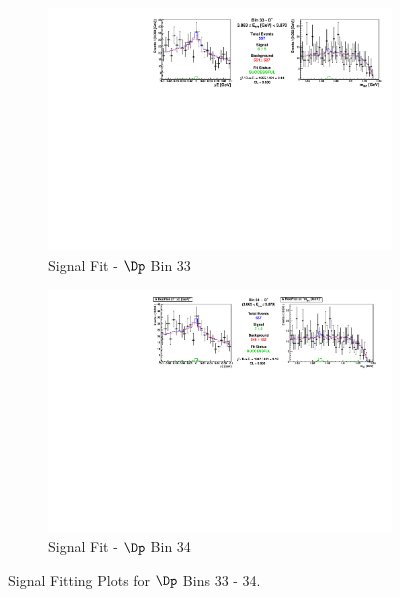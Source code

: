 \begin{figure}[h]

\begin{subfigure}[c]{0.99\textwidth}
\includegraphics[width=\textwidth]{figures/plots/fit_results/Dp_bin_33.pdf}
\caption*{Signal Fit - $\Dp$ Bin 33}
\end{subfigure}

\vspace{5pt}

\begin{subfigure}[c]{0.99\textwidth}
\includegraphics[width=\textwidth]{figures/plots/fit_results/Dp_bin_34.pdf}
\caption*{Signal Fit - $\Dp$ Bin 34}
\end{subfigure}

\caption{Signal Fitting Plots for $\Dp$ Bins 33 - 34.}
\label{fig:Dp_plots_33_34}

\end{figure}

